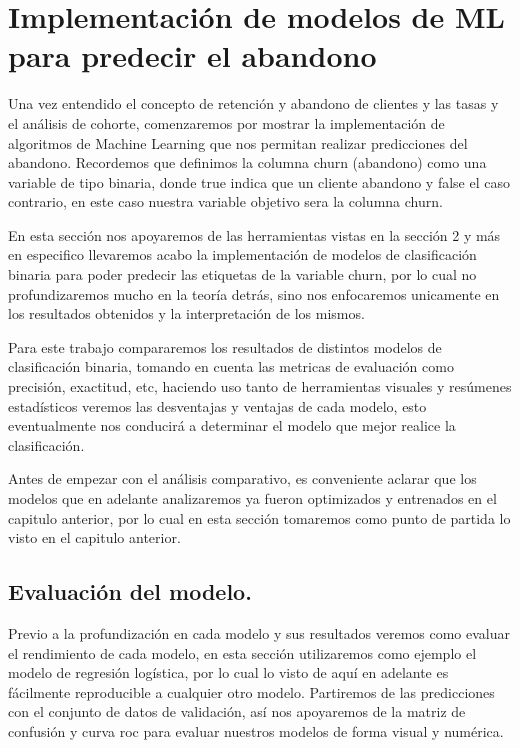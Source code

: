 \newpage
\section{Implementación de modelos de ML para predecir el abandono}

Una vez entendido el concepto de retención y abandono de clientes y las tasas y el análisis de cohorte, comenzaremos por mostrar la implementación de algoritmos de Machine Learning que nos permitan realizar predicciones del abandono. Recordemos que definimos la columna churn (abandono) como una variable de tipo binaria, donde true indica que un cliente abandono y false el caso contrario, en este caso nuestra variable objetivo sera la columna churn. 

En esta sección nos apoyaremos de las herramientas vistas en la sección 2 y más en especifico llevaremos acabo la implementación de modelos de clasificación binaria para poder predecir las etiquetas de la variable churn, por lo cual no profundizaremos mucho en la teoría detrás, sino nos enfocaremos unicamente en los resultados obtenidos y la interpretación de los mismos.

Para este trabajo compararemos los resultados de distintos modelos de clasificación binaria, tomando en cuenta las metricas de evaluación como precisión, exactitud, etc, haciendo uso tanto de herramientas visuales y resúmenes estadísticos veremos las desventajas y ventajas de cada modelo, esto eventualmente nos conducirá a determinar el modelo que mejor realice la clasificación.


Antes de empezar con el análisis comparativo, es conveniente aclarar que los modelos que en adelante analizaremos ya fueron optimizados y entrenados en el capitulo anterior, por lo cual en esta sección tomaremos como punto de partida lo visto en el capitulo anterior. 

\subsection{Evaluación del modelo.}

Previo a la profundización en cada modelo y sus resultados veremos como evaluar el rendimiento de cada modelo, en esta sección utilizaremos como ejemplo el modelo de regresión logística, por lo cual lo visto de aquí en adelante es fácilmente reproducible a cualquier otro modelo. Partiremos de las predicciones con el conjunto de datos de validación, así nos apoyaremos de la matriz de confusión y curva roc para evaluar nuestros modelos de forma visual y numérica.


